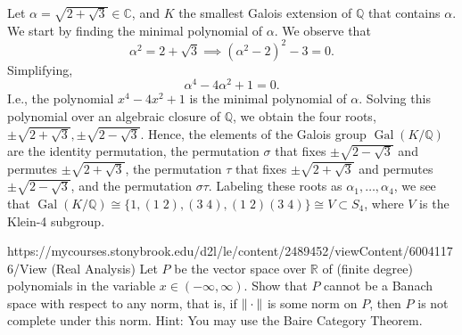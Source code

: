 \documentclass{article}
\begin{document}
\begin{solutions}
	Let $\alpha = \sqrt{2 + \sqrt{3}} \in \mathbb{C}$, and $K$ the smallest Galois extension of $\mathbb{Q}$ that contains $\alpha$. We start by finding the minimal polynomial of $\alpha$. We observe that 
	\begin{equation}
		\alpha^{2} = 2 + \sqrt{3} \implies (\alpha^{2} - 2)^{2} - 3 = 0. 
	\end{equation}
	Simplifying, 
	\begin{equation}
		\alpha^{4} - 4\alpha^{2} + 1 = 0. 
	\end{equation}
	I.e., the polynomial $x^{4} - 4x^{2} + 1$ is the minimal polynomial of $\alpha$. Solving this polynomial over an algebraic closure of $\mathbb{Q}$, we obtain the four roots, $\pm\sqrt{2 + \sqrt{3}}, \pm \sqrt{2 - \sqrt{3}}$. Hence, the elements of the Galois group $\operatorname{Gal}(K/\mathbb{Q})$ are the identity permutation, the permutation $\sigma$ that fixes $\pm \sqrt{2 - \sqrt{3}}$ and permutes $\pm \sqrt{2 + \sqrt{3}}$, the permutation $\tau$ that fixes $\pm\sqrt{2 + \sqrt{3}}$ and permutes $\pm \sqrt{2 - \sqrt{3}}$, and the permutation $\sigma \tau$. Labeling these roots as $\alpha_{1}, \ldots, \alpha_{4}$, we see that $\operatorname{Gal}(K/\mathbb{Q}) \cong \{1, (1\;2), (3\;4), (1\;2)(3\;4)\} \cong V \subset S_{4}$, where $V$ is the Klein-4 subgroup. 
\end{solutions}
\begin{prb}{https://mycourses.stonybrook.edu/d2l/le/content/2489452/viewContent/60041176/View (Real Analysis)}
	Let $P$ be the vector space over $\mathbb{R}$ of (finite degree) polynomials in the variable $x \in (-\infty, \infty)$. Show that $P$ cannot be a Banach space with respect to any norm, that is, if $\left\Vert \hspace{2pt}\cdot\hspace{2pt} \right\Vert$ is some norm on $P$, then $P$ is not complete under this norm. Hint: You may use the Baire Category Theorem. 
\end{prb}
\end{document}
